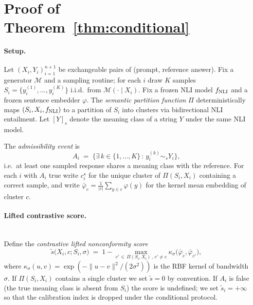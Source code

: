 %

\section{Proof of Theorem~\ref{thm:conditional}}
\label{sec:theorem}

\paragraph{Setup.}
Let $(X_i, Y_i)_{i=1}^{n+1}$ be exchangeable pairs of (prompt, reference
answer). Fix a generator $\mathcal{M}$ and a sampling routine; for each
$i$ draw $K$ samples $S_i = \{y_i^{(1)}, \dots, y_i^{(K)}\}$ i.i.d.\ from
$\mathcal{M}(\cdot \mid X_i)$. Fix a frozen NLI model $f_{\rm NLI}$ and a
frozen sentence embedder $\varphi$. The \emph{semantic partition function}
$\Pi$ deterministically maps $(S_i, X_i, f_{\rm NLI})$ to a partition of
$S_i$ into clusters via bidirectional NLI entailment. Let
$[Y]_s$ denote the meaning class of a string $Y$ under the same NLI model.

The \emph{admissibility event} is
\[
A_i \;=\; \bigl\{\exists\, k \in \{1, \dots, K\}\, :\, y_i^{(k)} \sim_s Y_i\bigr\},
\]
i.e.\ at least one sampled response shares a meaning class with the
reference. For each $i$ with $A_i$ true write $c_i^\star$ for the unique
cluster of $\Pi(S_i, X_i)$ containing a correct sample, and write
$\bar\varphi_c = \frac{1}{|c|} \sum_{y \in c} \varphi(y)$ for the kernel
mean embedding of cluster $c$.

\paragraph{Lifted contrastive score.} \mbox{}\\
Define the \emph{contrastive lifted nonconformity score}
\begin{equation}
\label{eq:contrastive-score-v2}
\tilde{s}\bigl(X_i, c; S_i, \sigma\bigr)
\;=\; 1 - \max_{c'\, \in\, \Pi(S_i, X_i)\, ,\, c' \neq c}
       \kappa_\sigma\!\bigl(\bar\varphi_c, \bar\varphi_{c'}\bigr),
\end{equation}
where $\kappa_\sigma(u, v) = \exp(-\|u-v\|^2 / (2\sigma^2))$ is the RBF
kernel of bandwidth $\sigma$. If $\Pi(S_i, X_i)$ contains a single cluster
we set $\tilde{s} = 0$ by convention. If $A_i$ is false (the true meaning
class is absent from $S_i$) the score is undefined; we set
$\tilde{s}_i = +\infty$ so that the calibration index is dropped under
the conditional protocol.

